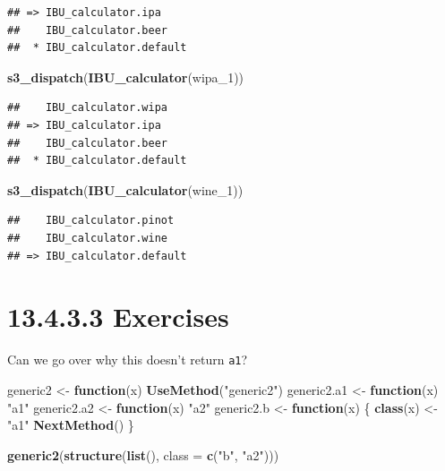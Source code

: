 \documentclass[]{book}
\newenvironment{Shaded}{\begin{snugshade}}{\end{snugshade}}
\newcommand{\ControlFlowTok}[1]{\textcolor[rgb]{0.13,0.29,0.53}{\textbf{#1}}}
\newcommand{\DataTypeTok}[1]{\textcolor[rgb]{0.13,0.29,0.53}{#1}}
\newcommand{\DecValTok}[1]{\textcolor[rgb]{0.00,0.00,0.81}{#1}}
\newcommand{\KeywordTok}[1]{\textcolor[rgb]{0.13,0.29,0.53}{\textbf{#1}}}
\newcommand{\NormalTok}[1]{#1}
\newcommand{\StringTok}[1]{\textcolor[rgb]{0.31,0.60,0.02}{#1}}
\begin{document}
\begin{verbatim}
## => IBU_calculator.ipa
##    IBU_calculator.beer
##  * IBU_calculator.default
\end{verbatim}

\begin{Shaded}
\begin{Highlighting}[]
\KeywordTok{s3_dispatch}\NormalTok{(}\KeywordTok{IBU_calculator}\NormalTok{(wipa_}\DecValTok{1}\NormalTok{))}
\end{Highlighting}
\end{Shaded}

\begin{verbatim}
##    IBU_calculator.wipa
## => IBU_calculator.ipa
##    IBU_calculator.beer
##  * IBU_calculator.default
\end{verbatim}

\begin{Shaded}
\begin{Highlighting}[]
\KeywordTok{s3_dispatch}\NormalTok{(}\KeywordTok{IBU_calculator}\NormalTok{(wine_}\DecValTok{1}\NormalTok{))}
\end{Highlighting}
\end{Shaded}

\begin{verbatim}
##    IBU_calculator.pinot
##    IBU_calculator.wine
## => IBU_calculator.default
\end{verbatim}

\hypertarget{exercises-13}{%
\section*{13.4.3.3 Exercises}\label{exercises-13}}

Can we go over why this doesn't return \texttt{a1}?

\begin{Shaded}
\begin{Highlighting}[]
\NormalTok{generic2 <-}\StringTok{ }\ControlFlowTok{function}\NormalTok{(x) }\KeywordTok{UseMethod}\NormalTok{(}\StringTok{"generic2"}\NormalTok{)}
\NormalTok{generic2.a1 <-}\StringTok{ }\ControlFlowTok{function}\NormalTok{(x) }\StringTok{"a1"}
\NormalTok{generic2.a2 <-}\StringTok{ }\ControlFlowTok{function}\NormalTok{(x) }\StringTok{"a2"}
\NormalTok{generic2.b <-}\StringTok{ }\ControlFlowTok{function}\NormalTok{(x) \{}
  \KeywordTok{class}\NormalTok{(x) <-}\StringTok{ "a1"}
  \KeywordTok{NextMethod}\NormalTok{()}
\NormalTok{\}}

\KeywordTok{generic2}\NormalTok{(}\KeywordTok{structure}\NormalTok{(}\KeywordTok{list}\NormalTok{(), }\DataTypeTok{class =} \KeywordTok{c}\NormalTok{(}\StringTok{"b"}\NormalTok{, }\StringTok{"a2"}\NormalTok{)))}
\end{Highlighting}
\end{Shaded}
\end{document}
